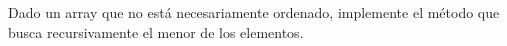 Dado un array que no está necesariamente ordenado, implemente el método que busca recursivamente el menor de los elementos.
